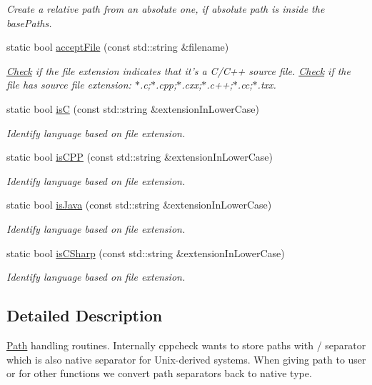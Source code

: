 \begin{DoxyCompactItemize}
\begin{DoxyCompactList}\small\item\em Create a relative path from an absolute one, if absolute path is inside the base\-Paths. \end{DoxyCompactList}\item 
static bool \hyperlink{class_path_a8a82b5ee3678ae1238a723a6ab352ff9}{accept\-File} (const std\-::string \&filename)
\begin{DoxyCompactList}\small\item\em \hyperlink{class_check}{Check} if the file extension indicates that it's a C/\-C++ source file. \hyperlink{class_check}{Check} if the file has source file extension\-: $\ast$.c;$\ast$.cpp;$\ast$.cxx;$\ast$.c++;$\ast$.cc;$\ast$.txx. \end{DoxyCompactList}\item 
static bool \hyperlink{class_path_a02c2287a4ef7ed859d27cb32c7c7c631}{is\-C} (const std\-::string \&extension\-In\-Lower\-Case)
\begin{DoxyCompactList}\small\item\em Identify language based on file extension. \end{DoxyCompactList}\item 
static bool \hyperlink{class_path_a69d7efde9be00cac4536d6da3c90a10a}{is\-C\-P\-P} (const std\-::string \&extension\-In\-Lower\-Case)
\begin{DoxyCompactList}\small\item\em Identify language based on file extension. \end{DoxyCompactList}\item 
static bool \hyperlink{class_path_a741887ba94defe7014f3162efa74241e}{is\-Java} (const std\-::string \&extension\-In\-Lower\-Case)
\begin{DoxyCompactList}\small\item\em Identify language based on file extension. \end{DoxyCompactList}\item 
static bool \hyperlink{class_path_a1f8f814dc4da6880efe406384be0bba3}{is\-C\-Sharp} (const std\-::string \&extension\-In\-Lower\-Case)
\begin{DoxyCompactList}\small\item\em Identify language based on file extension. \end{DoxyCompactList}\end{DoxyCompactItemize}


\subsection{Detailed Description}
\hyperlink{class_path}{Path} handling routines. Internally cppcheck wants to store paths with / separator which is also native separator for Unix-\/derived systems. When giving path to user or for other functions we convert path separators back to native type. 

